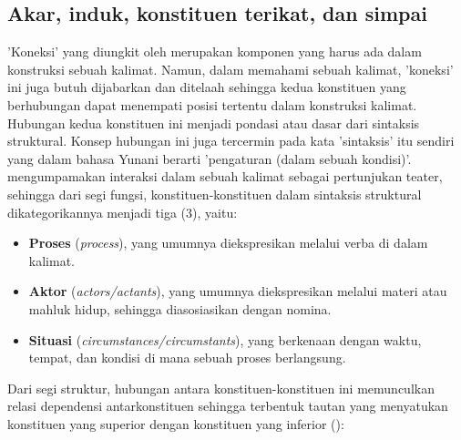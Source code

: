 \subsection{Akar, induk, konstituen terikat, dan simpai}
'Koneksi' yang diungkit oleh \cite{tesniere1959elements} merupakan komponen yang harus ada dalam konstruksi sebuah kalimat. Namun, dalam memahami sebuah kalimat, 'koneksi' ini juga butuh dijabarkan dan ditelaah sehingga kedua konstituen yang berhubungan dapat menempati posisi tertentu dalam konstruksi kalimat. Hubungan kedua konstituen ini menjadi pondasi atau dasar dari sintaksis struktural. Konsep hubungan ini juga tercermin pada kata 'sintaksis' itu sendiri yang dalam bahasa Yunani berarti 'pengaturan (dalam sebuah kondisi)'. \cite{tesniere1959elements} mengumpamakan interaksi dalam sebuah kalimat sebagai pertunjukan teater, sehingga dari segi fungsi, konstituen-konstituen dalam sintaksis struktural dikategorikannya menjadi tiga (3), yaitu:
\begin{itemize}
\item \textbf{Proses} (\textit{process}), yang umumnya diekspresikan melalui verba di dalam kalimat.
\item \textbf{Aktor} (\textit{actors/actants}), yang umumnya diekspresikan melalui materi atau mahluk hidup, sehingga diasosiasikan dengan nomina.
\item \textbf{Situasi} (\textit{circumstances/circumstants}), yang berkenaan dengan waktu, tempat, dan kondisi di mana sebuah proses berlangsung.
\end{itemize}
Dari segi struktur, hubungan antara konstituen-konstituen ini memunculkan relasi dependensi antarkonstituen sehingga terbentuk tautan yang menyatukan konstituen yang superior dengan konstituen yang inferior (\citealp{tesniere1959elements, hudson2010introduction, heringer1993dependency}): 
